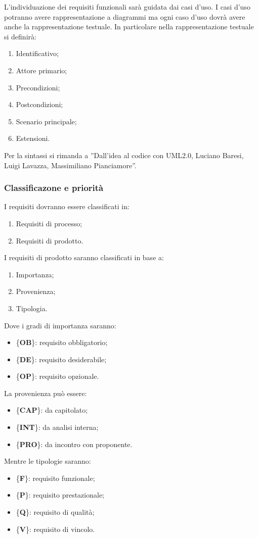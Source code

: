 {{{			L’individuazione dei requisiti funzionali sar\`{a} guidata dai casi d’uso. I casi d’uso potranno avere rappresentazione a diagrammi ma ogni caso d’uso dovr\`{a} avere anche la rappresentazione testuale. In particolare nella rappresentazione testuale si definir\`{a}:
			\begin{enumerate}
				\item Identificativo;
				\item Attore primario;
				\item Precondizioni;
				\item Postcondizioni;
				\item Scenario principale;
				\item Estensioni.
			\end{enumerate}
			Per la sintassi si rimanda a ”Dall’idea al codice con UML2.0, Luciano Baresi, Luigi Lavazza, Massimiliano Pianciamore”.
			}
			\subsubsection{Classificazone e priorit\`{a}}{
				I requisiti dovranno essere classificati in:
				\begin{enumerate}
					\item Requisiti\ped{g} di processo;
					\item Requisiti di prodotto.
				\end{enumerate}
				I requisiti di prodotto saranno classificati in base a:
				\begin{enumerate}
					\item Importanza;
					\item Provenienza;
					\item Tipologia.
				\end{enumerate}
				Dove i gradi di importanza saranno:
				\begin{itemize}
						\item \{\textbf{OB}\}: requisito obbligatorio;
						\item \{\textbf{DE}\}: requisito desiderabile;
						\item \{\textbf{OP}\}: requisito opzionale.
				\end{itemize}
				La provenienza pu\`{o} essere:
				\begin{itemize}
					\item \{\textbf{CAP}\}: da capitolato;
					\item \{\textbf{INT}\}: da analisi interna;
					\item \{\textbf{PRO}\}: da incontro con proponente.
				\end{itemize}
				Mentre le tipologie saranno:
				\begin{itemize}
					\item \{\textbf{F}\}: requisito funzionale;
					\item \{\textbf{P}\}: requisito prestazionale;
					\item \{\textbf{Q}\}: requisito di qualit\`{a};
					\item \{\textbf{V}\}: requisito di vincolo.
				\end{itemize}
			}
}}
